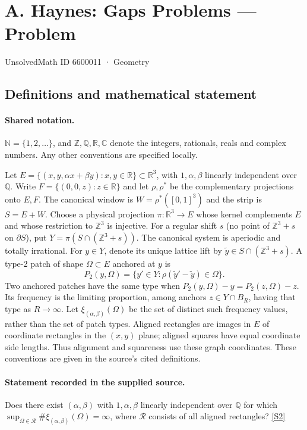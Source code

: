 \documentclass[11pt]{article}
\newcommand{\sref}[2]{\hyperlink{source:#1:#2}{[S#2]}}
\begin{document}
\setcounter{section}{6600010}
\section{A. Haynes: Gaps Problems — Problem}\label{6600011}
{\small\sffamily UnsolvedMath ID 6600011 · Geometry}
\subsection{Definitions and mathematical statement}

\paragraph{Shared notation.}$\mathbb N=\{1,2,\ldots\}$, and $\mathbb Z,\mathbb Q,\mathbb R,\mathbb C$ denote the integers, rationals, reals and complex numbers. Any other conventions are specified locally.


Let $E=\{(x,y,\alpha x+\beta y):x,y\in\mathbb R\}\subset\mathbb R^3$, with $1,\alpha,\beta$ linearly independent over $\mathbb Q$. Write $F=\{(0,0,z):z\in\mathbb R\}$ and let $\rho,\rho^*$ be the complementary projections onto $E,F$. The canonical window is $W=\rho^*([0,1]^3)$ and the strip is $S=E+W$. Choose a physical projection $\pi:\mathbb R^3\to E$ whose kernel complements $E$ and whose restriction to $\mathbb Z^3$ is injective. For a regular shift $s$ (no point of $\mathbb Z^3+s$ on $\partial S$), put $Y=\pi(S\cap(\mathbb Z^3+s))$. The canonical system is aperiodic and totally irrational. For $y\in Y$, denote its unique lattice lift by $\widetilde y\in S\cap(\mathbb Z^3+s)$. A type-2 patch of shape $\Omega\subset E$ anchored at $y$ is
\[P_2(y,\Omega)=\{y'\in Y:\rho(\widetilde y'-\widetilde y)\in\Omega\}.\]
Two anchored patches have the same type when $P_2(y,\Omega)-y=P_2(z,\Omega)-z$. Its frequency is the limiting proportion, among anchors $z\in Y\cap B_R$, having that type as $R\to\infty$. Let $\xi_{(\alpha,\beta)}(\Omega)$ be the set of distinct such frequency values, rather than the set of patch types. Aligned rectangles are images in $E$ of coordinate rectangles in the $(x,y)$ plane; aligned squares have equal coordinate side lengths. Thus alignment and squareness use these graph coordinates. These conventions are given in the source’s cited definitions.
\paragraph{Statement recorded in the supplied source.}
Does there exist $(\alpha,\beta)$ with $1,\alpha,\beta$ linearly independent over $\mathbb Q$ for which $\sup_{\Omega\in\mathcal R}\#\xi_{(\alpha,\beta)}(\Omega)=\infty$, where $\mathcal R$ consists of all aligned rectangles? \sref{6600011}{2}
\end{document}
